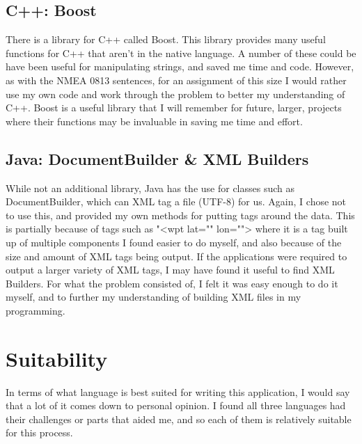 \documentclass{article}
\begin{document}
\subsection{C++: Boost}
There is a library for C++ called Boost\cite{boost}. This library provides many useful functions for C++ that aren't in the native language. A number of these could be have been useful for manipulating strings, and saved me time and code. However, as with the NMEA 0813 sentences, for an assignment of this size I would rather use my own code and work through the problem to better my understanding of C++. Boost is a useful library that I will remember for future, larger, projects where their functions may be invaluable in saving me time and effort.

\subsection{Java: DocumentBuilder \& XML Builders}
While not an additional library, Java has the use for classes such as DocumentBuilder, which can XML tag a file (UTF-8) for us. Again, I chose not to use this, and provided my own methods for putting tags around the data. This is partially because of tags such as "<wpt lat="" lon=""> where it is a tag built up of multiple components I found easier to do myself, and also because of the size and amount of XML tags being output. If the applications were required to output a larger variety of XML tags, I may have found it useful to find XML Builders. For what the problem consisted of, I felt it was easy enough to do it myself, and to further my understanding of building XML files in my programming.



\section{Suitability}

In terms of what language is best suited for writing this application, I would say that a lot of it comes down to personal opinion. I found all three languages had their challenges or parts that aided me, and so each of them is relatively suitable for this process. 
\end{document}
